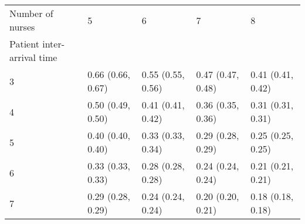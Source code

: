 \begin{tabular}{lllll}
\toprule
Number of nurses & 5 & 6 & 7 & 8 \\
Patient inter-arrival time &  &  &  &  \\
\midrule
3 & 0.66 (0.66, 0.67) & 0.55 (0.55, 0.56) & 0.47 (0.47, 0.48) & 0.41 (0.41, 0.42) \\
4 & 0.50 (0.49, 0.50) & 0.41 (0.41, 0.42) & 0.36 (0.35, 0.36) & 0.31 (0.31, 0.31) \\
5 & 0.40 (0.40, 0.40) & 0.33 (0.33, 0.34) & 0.29 (0.28, 0.29) & 0.25 (0.25, 0.25) \\
6 & 0.33 (0.33, 0.33) & 0.28 (0.28, 0.28) & 0.24 (0.24, 0.24) & 0.21 (0.21, 0.21) \\
7 & 0.29 (0.28, 0.29) & 0.24 (0.24, 0.24) & 0.20 (0.20, 0.21) & 0.18 (0.18, 0.18) \\
\bottomrule
\end{tabular}
